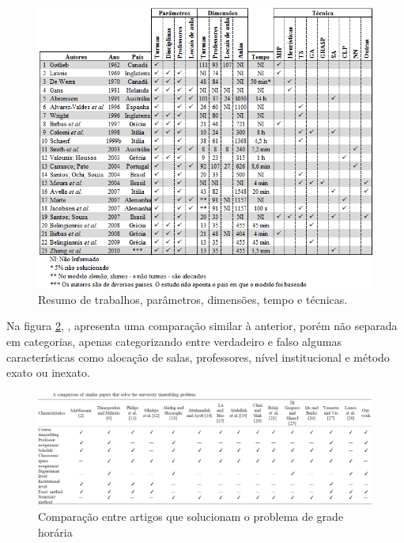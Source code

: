 
\begin{figure}[htbp]\centering
    \caption{\label{Desenvolvimento}Resumo de trabalhos, parâmetros, dimensões, tempo e técnicas.}
    \includegraphics[angle=0,scale=1]{files/img/tabelas/Desenvolvimento.png}
\end{figure}    %

Na figura \ref{University}, \cite{arratia-martinez_university_2021}, apresenta uma comparação similar à anterior, porém não separada em categorias, apenas categorizando entre verdadeiro e falso algumas características como alocação de salas, professores, nível institucional e método exato ou inexato.

\begin{figure}[htbp]\centering
    \caption{\label{University}Comparação entre artigos que solucionam o problema de grade horária}
    \includegraphics[angle=0,scale=0.37]{files/img/tabelas/University.png}
\end{figure}    %


